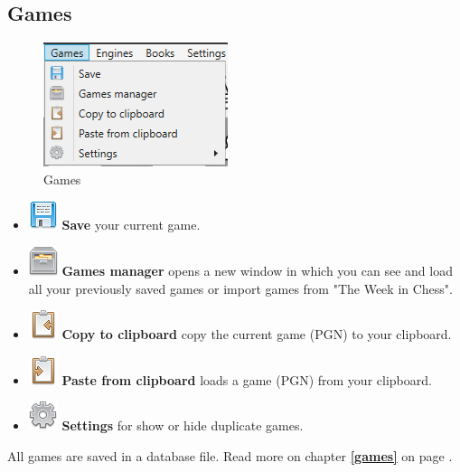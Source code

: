 \documentclass[11pt,a4paper]{article}
\begin{document}
\subsection{Games}
\begin{figure}[H]
	\centering
	\includegraphics[scale=1.0]{Games1.png}
	\caption{Games}
	\label{fig:Games}
\end{figure}
\begin{itemize}
	\item \includegraphics[scale=0.5]{diskette.png} \textbf{Save} your current game.
	\item \includegraphics[scale=0.5]{file_manager.png}  \textbf{Games manager} opens a new window in which you can see and load all your previously saved games or import games from "The Week in Chess".
	\item \includegraphics[scale=0.5]{clipboard_sign_out.png}  \textbf{Copy to clipboard} copy the current game (PGN) to your clipboard.	
	\item \includegraphics[scale=0.5]{clipboard_sign.png}  \textbf{Paste from clipboard} loads a game (PGN) from your clipboard.
	\item \includegraphics[scale=0.5]{cog.png}  \textbf{Settings} for show or hide duplicate games.
	
\end{itemize}
All games are saved in a database file. Read more on chapter \textbf{\ref{games}  } on page \pageref{games}.
\end{document}
